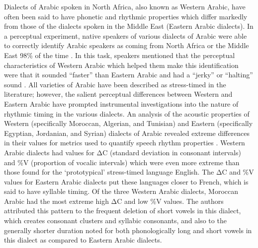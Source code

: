   Dialects of Arabic spoken in North Africa, also known as Western Arabic, have often been said to have phonetic and rhythmic properties which differ markedly from those of the dialects spoken in the Middle East (Eastern Arabic dialects). In a perceptual experiment, native speakers of various dialects of Arabic were able to correctly identify Arabic speakers as coming from North Africa or the Middle East 98\% of the time \citep{BarkatEtAl1999}. In this task, speakers mentioned that the perceptual characteristics of Western Arabic which helped them make this identification were that it sounded “faster” than Eastern Arabic and had a “jerky” or “halting” sound \citep{GhazaliEtAl2002}. All varieties of Arabic have been described as stress-timed in the literature; however, the salient perceptual differences between Western and Eastern Arabic have prompted instrumental investigations into the nature of rhythmic timing in the various dialects. An analysis of the acoustic properties of Western (specifically Moroccan, Algerian, and Tunisian) and Eastern (specifically Egyptian, Jordanian, and Syrian) dialects of Arabic revealed extreme differences in their values for metrics used to quantify speech rhythm properties \citep{HamdiEtAl2004}. Western Arabic dialects had values for ΔC (standard deviation in consonant intervals) and \%V (proportion of vocalic intervals) which were even more extreme than those found for the ‘prototypical’ stress-timed language English. The ΔC and \%V values for Eastern Arabic dialects put these languages closer to French, which is said to have syllable timing. Of the three Western Arabic dialects, Moroccan Arabic had the most extreme high ΔC and low \%V values. The authors attributed this pattern to the frequent deletion of short vowels in this dialect, which creates consonant clusters and syllabic consonants, and also to the generally shorter duration noted for both phonologically long and short vowels in this dialect as compared to Eastern Arabic dialects.



